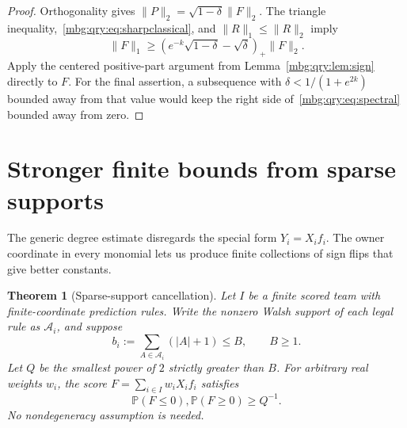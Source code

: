 \documentclass[11pt,letterpaper]{article}
\newtheorem{theorem}{Theorem}[section]
\theoremstyle{definition}
\newcommand{\Prb}{\mathbb P}
\begin{document}
\begin{proof}
Orthogonality gives
\(\|P\|_2=\sqrt{1-\delta}\|F\|_2\).
The triangle inequality,~\eqref{mbg:qry:eq:sharpclassical}, and
\(\|R\|_1\le\|R\|_2\) imply
\[
 \|F\|_1\ge
 \left(e^{-k}\sqrt{1-\delta}-\sqrt{\delta}\right)_+\|F\|_2.
\]
Apply the centered positive-part argument from Lemma~\ref{mbg:qry:lem:sign}
directly to \(F\). For the final assertion, a subsequence with
\(\delta<1/(1+e^{2k})\) bounded away from that value would keep the
right side of~\eqref{mbg:qry:eq:spectral} bounded away from zero.
\end{proof}

\section{Stronger finite bounds from sparse supports}
\label{mbg:qry:sec:supports}

The generic degree estimate disregards the special form \(Y_i=X_if_i\).
The owner coordinate in every monomial lets us produce finite
collections of sign flips that give better constants.

\begin{theorem}[Sparse-support cancellation]
\label{mbg:qry:thm:support}
Let \(I\) be a finite scored team with finite-coordinate prediction rules.
Write the nonzero Walsh support of
each legal rule as \(\mathcal A_i\), and suppose
\[
 b_i:=\sum_{A\in\mathcal A_i}(|A|+1)\le B,
 \qquad B\ge1.
\]
Let \(Q\) be the smallest power of \(2\) strictly greater than \(B\).
For arbitrary real weights \(w_i\), the score
\(F=\sum_{i\in I}w_iX_if_i\) satisfies
\begin{equation}
 \Prb(F\le0),\Prb(F\ge0)\ge Q^{-1}.
 \label{mbg:qry:eq:support-bound}
\end{equation}
No nondegeneracy assumption is needed.
\end{theorem}
\end{document}
